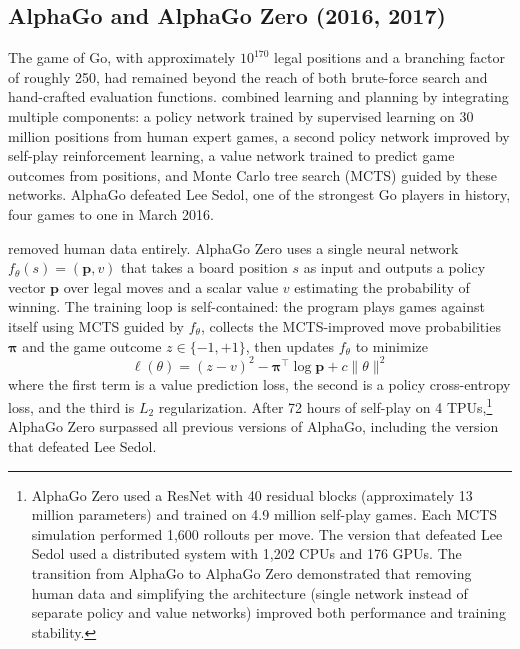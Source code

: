 \subsection{AlphaGo and AlphaGo Zero (2016, 2017)}

The game of Go, with approximately $10^{170}$ legal positions and a branching factor of roughly 250, had remained beyond the reach of both brute-force search and hand-crafted evaluation functions. \citet{Silver2016} combined learning and planning by integrating multiple components: a policy network trained by supervised learning on 30 million positions from human expert games, a second policy network improved by self-play reinforcement learning, a value network trained to predict game outcomes from positions, and Monte Carlo tree search (MCTS) guided by these networks. AlphaGo defeated Lee Sedol, one of the strongest Go players in history, four games to one in March 2016.

\citet{Silver2017} removed human data entirely. AlphaGo Zero uses a single neural network $f_\theta(s) = (\mathbf{p}, v)$ that takes a board position $s$ as input and outputs a policy vector $\mathbf{p}$ over legal moves and a scalar value $v$ estimating the probability of winning. The training loop is self-contained: the program plays games against itself using MCTS guided by $f_\theta$, collects the MCTS-improved move probabilities $\boldsymbol{\pi}$ and the game outcome $z \in \{-1, +1\}$, then updates $f_\theta$ to minimize
\begin{equation}
\ell(\theta) = (z - v)^2 - \boldsymbol{\pi}^\top \log \mathbf{p} + c \|\theta\|^2
\end{equation}
where the first term is a value prediction loss, the second is a policy cross-entropy loss, and the third is $L_2$ regularization. After 72 hours of self-play on 4 TPUs,\footnote{AlphaGo Zero used a ResNet with 40 residual blocks (approximately 13 million parameters) and trained on 4.9 million self-play games. Each MCTS simulation performed 1{,}600 rollouts per move. The version that defeated Lee Sedol used a distributed system with 1{,}202 CPUs and 176 GPUs. The transition from AlphaGo to AlphaGo Zero demonstrated that removing human data and simplifying the architecture (single network instead of separate policy and value networks) improved both performance and training stability.} AlphaGo Zero surpassed all previous versions of AlphaGo, including the version that defeated Lee Sedol.

